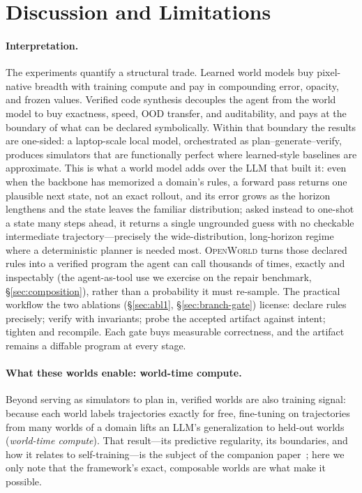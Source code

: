 \documentclass[11pt]{article}
\newcommand{\openworld}{\textsc{OpenWorld}}
\begin{document}
\section{Discussion and Limitations}\label{sec:discussion}
\paragraph{Interpretation.} The experiments quantify a structural trade.
Learned world models buy pixel-native breadth with training compute and pay
in compounding error, opacity, and frozen values. Verified code synthesis
decouples the agent from the world model to buy exactness, speed, OOD transfer,
and auditability, and pays at the boundary of what can be declared symbolically.
Within that boundary the results are one-sided: a laptop-scale local model,
orchestrated as plan--generate--verify, produces simulators that are functionally
perfect where learned-style baselines are approximate. This is what a world model adds over the LLM that built
it: even when the backbone has memorized a domain's rules, a forward pass returns one
plausible next state, not an exact rollout, and its error grows as the horizon lengthens and the
state leaves the familiar distribution; asked instead to one-shot a state many steps ahead, it
returns a single ungrounded guess with no checkable intermediate trajectory---precisely the
wide-distribution, long-horizon regime where a deterministic planner is needed most. \openworld{} turns those declared rules into a verified
program the agent can call thousands of times, exactly and inspectably (the agent-as-tool use we
exercise on the repair benchmark, \S\ref{sec:composition}), rather than a probability it must
re-sample. The practical workflow the two ablations (\S\ref{sec:abl1}, \S\ref{sec:branch-gate})
license: declare rules precisely; verify with invariants; probe the accepted
artifact against intent; tighten and recompile. Each gate buys measurable
correctness, and the artifact remains a diffable program at every stage.

\paragraph{What these worlds enable: world-time compute.} Beyond serving as simulators to plan in, verified worlds are also training signal: because each world labels trajectories exactly for free, fine-tuning on trajectories from many worlds of a domain lifts an LLM's generalization to held-out worlds (\emph{world-time compute}). That result---its predictive regularity, its boundaries, and how it relates to self-training---is the subject of the companion paper~\cite{openworld_wtc}; here we only note that the framework's exact, composable worlds are what make it possible.
\end{document}
